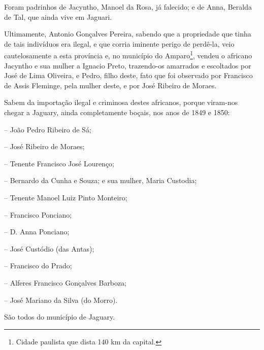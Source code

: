 Foram padrinhos de Jacyntho, Manoel da Rosa, já falecido; e de Anna,
Beralda de Tal, que ainda vive em Jaguari.

Ultimamente, Antonio Gonçalves Pereira, sabendo que a propriedade que
tinha de tais indivíduos era ilegal, e que corria iminente perigo de
perdê-la, veio cautelosamente a esta província e, no município do
Amparo\footnote{Cidade paulista que dista 140 km da capital.}, vendeu
o africano Jacyntho e sua mulher a Ignacio Preto, trazendo-os amarrados
e escoltados por José de Lima Oliveira, e Pedro, filho deste, fato que
foi observado por Francisco de Assis Fleminge, pela mulher deste, e por
José Ribeiro de Moraes.

Sabem da importação ilegal e criminosa destes africanos, porque
viram-nos chegar a Jaguary, ainda completamente boçais, nos anos de 1849
e 1850:

-- João Pedro Ribeiro de Sá;

-- José Ribeiro de Moraes;

-- Tenente Francisco José Lourenço;

-- Bernardo da Cunha e Souza; e sua mulher, Maria Custodia;

-- Tenente Manoel Luiz Pinto Monteiro;

-- Francisco Ponciano;

-- D. Anna Ponciano;

-- José Custódio (das Antas);

-- Francisco do Prado;

-- Alferes Francisco Gonçalves Barboza;

-- José Mariano da Silva (do Morro).

São todos do município de Jaguary.

